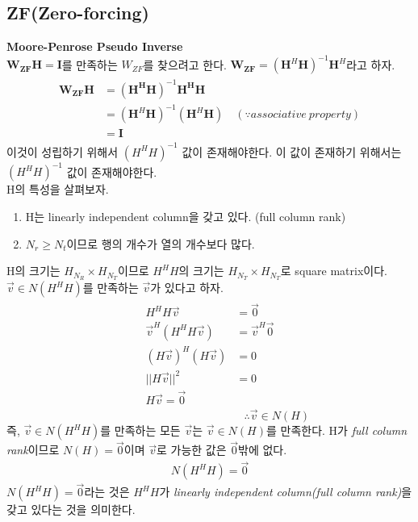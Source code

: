 \documentclass{article}
\newcommand{\bd}{\textbf} %
\begin{document}
\subsection{ZF(Zero-forcing)}
\bd{Moore-Penrose Pseudo Inverse}\\
$\boldsymbol{W_{ZF}H}=\boldsymbol{I}$를 만족하는 $W_{ZF}$를 찾으려고 한다. $\boldsymbol{W_{ZF}}=(\boldsymbol{H}^H \boldsymbol{H})^{-1}\boldsymbol{H}^H$라고 하자.
\begin{gather}
	\begin{split}
		\boldsymbol{W_{ZF}H}&=(\boldsymbol{H^H}\boldsymbol{H})^{-1}\boldsymbol{H^H}\boldsymbol{H}\\
		&=(\boldsymbol{H}^H \boldsymbol{H})^{-1}(\boldsymbol{H}^H \boldsymbol{H}) \quad (\because associative\ property)\\
		&=\boldsymbol{I}
	\end{split}
\end{gather}
이것이 성립하기 위해서 $(H^H H)^{-1}$ 값이 존재해야한다. 이 값이 존재하기 위해서는 $(H^H H)^{-1}$ 값이 존재해야한다.\\

\noindent
H의 특성을 살펴보자.
\begin{enumerate}
  \item H는 linearly independent column을 갖고 있다. (full column rank)
  \item $N_r\geq N_t$이므로 행의 개수가 열의 개수보다 많다.
\end{enumerate}
H의 크기는 $H_{N_R}\times H_{N_T}$이므로 $H^H H$의 크기는 $H_{N_T}\times H_{N_T}$로 square matrix이다.\\
\newpage
\noindent
$\vec{v} \in N(H^H H)$를 만족하는 $\vec{v}$가 있다고 하자.
\begin{gather}
\begin{split}
H^H H \vec{v} &= \vec{0}\\
\vec{v}^H(H^H H \vec{v})&=\vec{v}^H\vec{0}\\
(H\vec{v})^H(H \vec{v})&=0\\
||H\vec{v}||^2&=0\\
H\vec{v}=\vec{0}
\end{split}
\end{gather}
\vspace{0.1cm}
\begin{equation}
\hspace{5cm}\therefore \vec{v} \in N(H)
\end{equation}
즉, $\vec{v} \in N(H^H H)$를 만족하는 모든 $\vec{v}$는 $\vec{v} \in N(H)$를 만족한다. 
H가 \textsl{full column rank}이므로 $N(H)=\vec{0}$이며 $\vec{v}$로 가능한 값은 $\vec{0}$밖에 없다.
\begin{gather}
N(H^H H)=\vec{0}
\end{gather}
$N(H^H H)=\vec{0}$라는 것은 $H^H H$가 \textsl{linearly independent column(full column rank)}을 갖고 있다는 것을 의미한다.\\
\end{document}
